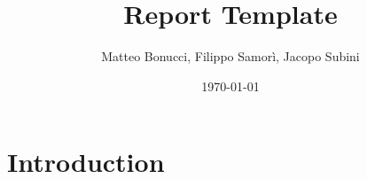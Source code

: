 \documentclass[12pt,a4paper]{article}
\title{Report Template}
\author{Matteo Bonucci, Filippo Samorì, Jacopo Subini}
\date{\today}
\begin{document}
\maketitle
\tableofcontents
\newpage

\section{Introduction}
\end{document}
